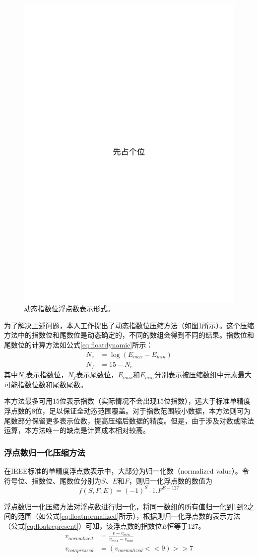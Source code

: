 \documentclass[degree=doctor]{thuthesis}
\begin{document}
\begin{figure}[ht]
\centering
\includegraphics[width=0.3\columnwidth]{figures/placeholder.pdf}
\caption{动态指数位浮点数表示形式。}
\label{fig:ieeefloatdynamic}
\end{figure}

为了解决上述问题，本人工作提出了动态指数位压缩方法（如图\ref{fig:ieeefloatdynamic}所示）。这个压缩方法中的指数位和尾数位是动态确定的，不同的数组会得到不同的结果。指数位和尾数位的计算方法如公式\ref{eq:floatdynamic}所示：
\begin{equation}
  \begin{aligned}
    N_e &= \log(E_{max} - E_{min}) \\
    N_f &= 15 - N_e
  \end{aligned}
  \label{eq:floatdynamic}
\end{equation}
其中$N_e$表示指数位，$N_f$表示尾数位，$E_{max}$和$E_{min}$分别表示被压缩数组中元素最大可能指数位数和尾数尾数。

本方法最多可用15位表示指数（实际情况不会出现15位指数），远大于标准单精度浮点数的8位，足以保证全动态范围覆盖。对于指数范围较小数据，本方法则可为尾数部分保留更多表示位数，提高压缩后数据的精度。但是，由于涉及对数或除法运算，本方法唯一的缺点是计算成本相对较高。

\subsubsection{浮点数归一化压缩方法}
在IEEE标准的单精度浮点数表示中，大部分为归一化数（normalized value）。令符号位、指数位、尾数位分别为$S$、$E$和$F$，则归一化浮点数的数值为
\begin{equation}
  f(S,F,E) = (-1)^S \cdot 1.F^{E-127}
\label{eq:floatrepresent}
\end{equation}

浮点数归一化压缩方法对浮点数进行归一化，将同一数组的所有值归一化到1到2之间的范围（如公式\ref{eq:floatnormalized}所示），根据则归一化浮点数的表示方法（公式\ref{eq:floatrepresent}）可知，该浮点数的指数位$E$恒等于127。
\begin{equation}
\begin{aligned}
  v_{normalized} &= \frac{v - v_{min}}{v_{max} - v_{min}} \\
  v_{compressed} &= (v_{normalized} << 9) >> 7
\end{aligned}
\label{eq:floatnormalized}
\end{equation}
\end{document}
